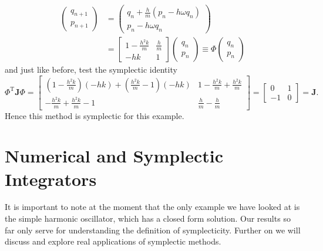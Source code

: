 \documentclass{report}
\begin{document}
\begin{equation*}
	\begin{aligned}
		\begin{pmatrix}
			q_{n+1} \\
			p_{n+1} 
		\end{pmatrix} &= \begin{pmatrix}
			q_{n} + \frac{h}{m} \left( p_{n} - h \omega q_n \right) \\
			p_{n} - h \omega q_n
		\end{pmatrix} \\
		&= \begin{bmatrix}
			1 - \frac{h^2 k}{m} & \frac{h}{m} \\
			-hk & 1
		\end{bmatrix} \begin{pmatrix}
			q_n \\
			p_n
		\end{pmatrix} \equiv \Phi \begin{pmatrix}
			q_n \\
			p_n
		\end{pmatrix}
	\end{aligned}
\end{equation*}
and just like before, test the symplectic identity
\begin{equation*}
	\Phi^\mathrm{T}\mathbf{J}\Phi = \begin{bmatrix}
		\left(1-\frac{h^2 k}{m}\right)(-hk) + \left(\frac{h^2 k}{m}-1\right)(-hk) & 1 - \frac{h^2 k}{m} + \frac{h^2 k}{m} \\
		-\frac{h^2 k}{m} + \frac{h^2 k}{m} -1 & \frac{h}{m} - \frac{h}{m}
	\end{bmatrix} = \begin{bmatrix}
		0 & 1 \\
		-1 & 0
	\end{bmatrix} = \mathbf{J}.
\end{equation*}
Hence this method is symplectic for this example.

\section{Numerical and Symplectic Integrators}

It is important to note at the moment that the only example we have looked at is the simple harmonic oscillator, which has a closed form solution.
Our results so far only serve for understanding the definition of symplecticity.
Further on we will discuss and explore real applications of symplectic methods.
\end{document}
